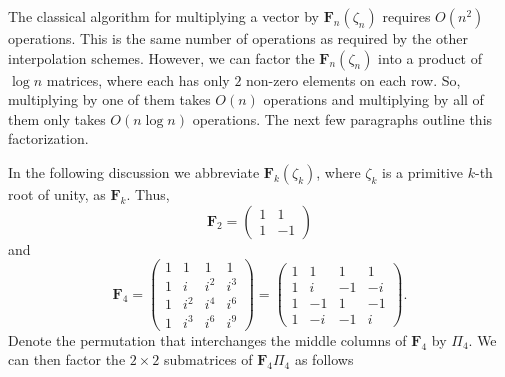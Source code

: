 The classical algorithm for multiplying a vector by
$\mathbf{F}_n(\zeta_n)$ requires $O(n^2)$ operations.  This is the same
number of operations as required by the other interpolation schemes.
However, we can factor the $\mathbf{F}_n(\zeta_n)$ into a product of $\log n$ 
matrices, where each has only $2$ non-zero elements on each row.  So, 
multiplying by one of them takes $O(n)$ operations and multiplying by all 
of them only takes $O(n \log n)$ operations.  The next few paragraphs 
outline this factorization. 

\medskip
In the following discussion we abbreviate $\mathbf{F}_k(\zeta_k)$,
where $\zeta_k$ is a primitive $k$-th root of unity, as $\mathbf{F}_k$.  
Thus,
\[
\mathbf{F}_2 = \left(\begin{array}{cc}1 & 1 \\ 1 & -1 \end{array}\right)
\]
and
\[
\mathbf{F}_4 = 
\left(
\begin{array}{cccc}
1 & 1   & 1   & 1   \\
1 & i   & i^2 & i^3 \\
1 & i^2 & i^4 & i^6 \\
1 & i^3 & i^6 & i^9
\end{array}
\right) = 
\left(
\begin{array}{cccc}
1 & 1  & 1  & 1   \\
1 & i  & -1 & -i \\
1 & -1 & 1  & -1 \\
1 & -i & -1 & i
\end{array}
\right).
\]
Denote the permutation that interchanges the middle columns of
$\mathbf{F}_4$ by $\Pi_4$. We can then factor the $2\times 2$ submatrices
of $\mathbf{F}_4 \Pi_4$ as follows
